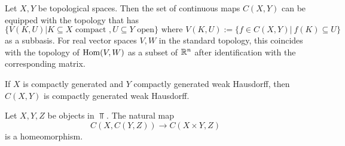 \begin{definition}
	Let $X,Y$ be topological spaces. Then the set of continuous maps $C(X,Y)$ can be equipped with the topology that has 
	\begin{equation*}
		\{V(K,U)|K\subseteq X \text{ compact }, U\subseteq Y \text{ open}\} \text{ where }V(K,U):=\{f\in C(X,Y) |~f(K)\subseteq U\}
	\end{equation*} as a subbasis. For real vector spaces $V,W$ in the standard topology, this coincides with the topology of $\operatorname{\mathrm{Hom}}(V,W)$ as a subset of $\mathbb{R}^n$ after identification with the corresponding matrix.
\end{definition}
\begin{proposition}
	If $X$ is compactly generated and $Y$ compactly generated weak Hausdorff, then $C(X,Y)$ is compactly generated weak Hausdorff. 
\end{proposition}
\begin{proposition}\label{prop:kTheo-curryingIsContinuous}
	Let $X,Y,Z$ be objects in $\Top$. The natural map
	\begin{equation*}
		C(X,C(Y,Z))\to C(X\times Y,Z)
	\end{equation*} is a homeomorphism.
\end{proposition}